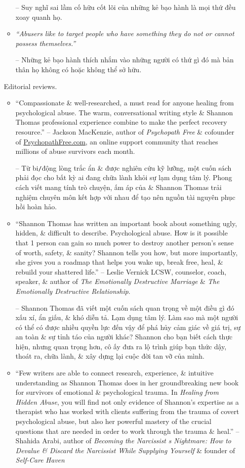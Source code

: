 \documentclass{article}
\begin{document}
\begin{enumerate}
\begin{itemize}
		-- Suy nghĩ sai lầm cố hữu cốt lõi của những kẻ bạo hành là mọi thứ đều xoay quanh họ.
		
		\item {\it``Abusers like to target people who have something they do not or cannot possess themselves.''}
		
		-- Những kẻ bạo hành thích nhắm vào những người có thứ gì đó mà bản thân họ không có hoặc không thể sở hữu.
	\end{itemize}
	{\sf Editorial reviews.}
	\begin{itemize}
		\item ``Compassionate \& well-researched, a must read for anyone healing from psychological abuse. The warm, conversational writing style \& {\sc Shannon Thomas} professional experience combine to make the perfect recovery resource.'' -- {\sc Jackson MacKenzie}, author of {\it Psychopath Free} \& cofounder of \url{PsychopathFree.com}, an online support community that reaches millions of abuse survivors each month.
		
		-- Từ bi{\tt/}động lòng trắc ẩn \& được nghiên cứu kỹ lưỡng, một cuốn sách phải đọc cho bất kỳ ai đang chữa lành khỏi sự lạm dụng tâm lý. Phong cách viết mang tính trò chuyện, ấm áp của \& {\sc Shannon Thomas} trải nghiệm chuyên môn kết hợp với nhau để tạo nên nguồn tài nguyên phục hồi hoàn hảo.
		
		\item ``{\sc Shannon Thomas} has written an important book about something ugly, hidden, \& difficult to describe. Psychological abuse. How is it possible that 1 person can gain so much power to destroy another person's sense of worth, safety, \& sanity? {\sc Shannon} tells you how, but more importantly, she gives you a roadmap that helps you wake up, break free, heal, \& rebuild your shattered life.'' -- {\sc Leslie Vernick LCSW}, counselor, coach, speaker, \& author of {\it The Emotionally Destructive Marriage} \& {\it The Emotionally Destructive Relationship}.
		
		-- {\sc Shannon Thomas} đã viết một cuốn sách quan trọng về một điều gì đó xấu xí, ẩn giấu, \& khó diễn tả. Lạm dụng tâm lý. Làm sao mà một người có thể có được nhiều quyền lực đến vậy để phá hủy cảm giác về giá trị, sự an toàn \& sự tỉnh táo của người khác? {\sc Shannon} cho bạn biết cách thực hiện, nhưng quan trọng hơn, cô ấy đưa ra lộ trình giúp bạn thức dậy, thoát ra, chữa lành, \& xây dựng lại cuộc đời tan vỡ của mình.
		
		\item ``Few writers are able to connect research, experience, \& intuitive understanding as {\sc Shannon Thomas} does in her groundbreaking new book for survivors of emotional \& psychological trauma. In {\it Healing from Hidden Abuse}, you will find not only evidence of {\sc Shannon}'s expertise as a therapist who has worked with clients suffering from the trauma of covert psychological abuse, but also her powerful mastery of the crucial questions that are needed in order to work through the trauma \& heal.'' -- {\sc Shahida Arabi}, author of {\it Becoming the Narcissist s Nightmare: How to Devalue \& Discard the Narcissist While Supplying Yourself} \& founder of {\it Self-Care Haven}
		

\end{itemize}
\end{enumerate}
\end{document}
